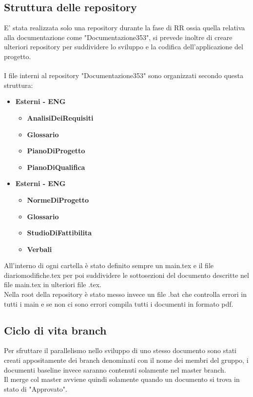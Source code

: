 \documentclass[NormeDiProgetto.tex]{subfiles}
\begin{document}
	\subsection{Struttura delle repository}
	E' stata realizzata solo una repository durante la fase di RR ossia quella relativa alla documentazione come "Documentazione353", si prevede inoltre di creare ulteriori repository per suddividere lo sviluppo e la codifica dell'applicazione del progetto. \\\\
	I file interni al repository "Documentazione353" sono organizzati secondo questa struttura:
	\begin{itemize}
		\item \textbf{Esterni - ENG}
				\begin{itemize}
				\item \textbf{AnalisiDeiRequisiti}
				\item \textbf{Glossario}
				\item \textbf{PianoDiProgetto}
				\item \textbf{PianoDiQualifica}
			\end{itemize}
		\item \textbf{Esterni - ENG}
				\begin{itemize}
					\item \textbf{NormeDiProgetto}
					\item \textbf{Glossario}
					\item \textbf{StudioDiFattibilita}
					\item \textbf{Verbali}
				\end{itemize}		
	\end{itemize}	
	All'interno di ogni cartella è stato definito sempre un main.tex e il file diariomodifiche.tex per poi suddividere le sottosezioni del documento descritte nel file main.tex in ulteriori file .tex.\\
	Nella root della repository è stato messo invece un file .bat che controlla errori in tutti i main e se non ci sono errori compila tutti i documenti in formato pdf.
	
	\subsection{Ciclo di vita branch}
	Per sfruttare il parallelismo nello sviluppo di uno stesso documento sono stati creati appositamente dei branch denominati con il nome dei membri del gruppo, i documenti baseline invece saranno contenuti solamente nel master branch.\\
	Il merge col master avviene quindi solamente quando un documento si trova in stato di "Approvato".
	
\end{document}
